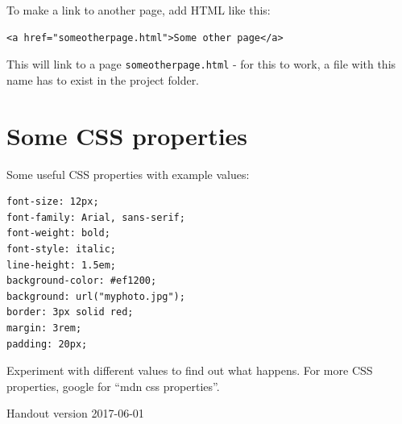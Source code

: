 \documentclass[10pt,a4paper]{article}
\begin{document}
To make a link to another page, add HTML like this:

\begin{lstlisting}
<a href="someotherpage.html">Some other page</a>
\end{lstlisting}

This will link to a page \lstinline|someotherpage.html| - for this to
work, a file with this name has to exist in the project folder.

\section*{Some CSS properties}

Some useful CSS properties with example values:

\begin{lstlisting}
font-size: 12px;
font-family: Arial, sans-serif;
font-weight: bold;
font-style: italic;
line-height: 1.5em;
background-color: #ef1200;
background: url("myphoto.jpg");
border: 3px solid red;
margin: 3rem;
padding: 20px;
\end{lstlisting}

Experiment with different values to find out what happens. For more
CSS properties, google for ``mdn css properties''.

\vfill

{\small Handout version 2017-06-01}
\end{document}
